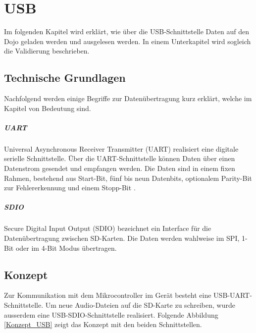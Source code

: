 \chapter{USB}
\label{USB}
\thispagestyle{fancy}  

Im folgenden Kapitel wird erklärt, wie über die USB-Schnittstelle Daten auf den Dojo geladen werden und ausgelesen werden. In einem Unterkapitel wird sogleich die Validierung beschrieben. 

\section{Technische Grundlagen}

Nachfolgend werden einige Begriffe zur Datenübertragung kurz erklärt, welche im Kapitel von Bedeutung sind.

\paragraph{UART}
Universal Asynchronous Receiver Transmitter (UART) realisiert eine digitale serielle Schnittstelle. Über die UART-Schnittstelle können Daten über einen Datenstrom gesendet und empfangen werden. Die Daten sind in einem fixen Rahmen, bestehend aus Start-Bit, fünf bis neun Datenbits, optionalem Parity-Bit zur Fehlererkennung und einem Stopp-Bit \cite{UARTdefinition}.

\paragraph{SDIO}
Secure Digital Input Output (SDIO) bezeichnet ein Interface für die Datenübertragung zwischen SD-Karten. Die Daten werden wahlweise im SPI, 1-Bit oder im 4-Bit Modus übertragen.

\section{Konzept}

Zur Kommunikation mit dem Mikrocontroller im Gerät besteht eine USB-UART-Schnittstelle. Um neue Audio-Dateien auf die SD-Karte zu schreiben, wurde ausserdem eine USB-SDIO-Schnittstelle realisiert. Folgende Abbildung \ref{Konzept_USB} zeigt das Konzept mit den beiden Schnittstellen.

